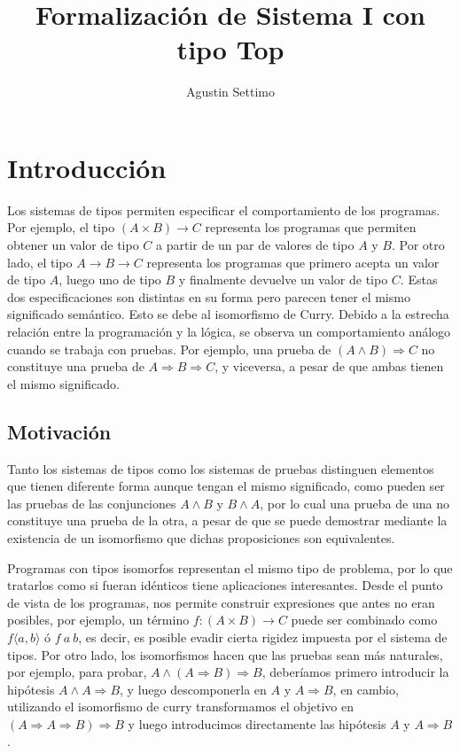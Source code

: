 \documentclass[]{report}
\title{Formalización de Sistema I con tipo Top}
\author{Agustin Settimo}
\begin{document}
	
	\maketitle
	\tableofcontents
	
	\begin{abstract}
		
	\end{abstract}
	
	\chapter{Introducción}
	Los sistemas de tipos permiten especificar el comportamiento de los programas.
	Por ejemplo, el tipo $(A \times B) \rightarrow C$ representa los programas que permiten obtener un valor de tipo $C$ a partir de un par de valores de tipo $A$ y $B$. Por otro lado, el tipo $A \rightarrow B \rightarrow C$ representa los programas que primero acepta un valor de tipo $A$, luego uno de tipo $B$ y finalmente devuelve un valor de tipo $C$.
	Estas dos especificaciones son distintas en su forma pero parecen tener el mismo significado semántico. Esto se debe al isomorfismo de Curry.
	Debido a la estrecha relación entre la programación y la lógica, se observa un comportamiento análogo cuando se trabaja con pruebas.
	Por ejemplo, una prueba de $(A \wedge B) \Rightarrow C$ no constituye una prueba de $A \Rightarrow B \Rightarrow C$, y viceversa, a pesar de que ambas tienen el mismo significado.
	
	\section{Motivación}
	
	Tanto los sistemas de tipos como los sistemas de pruebas distinguen elementos que tienen diferente forma aunque tengan el mismo significado, como pueden ser las pruebas de las conjunciones $A \wedge B$ y $B \wedge A$, por lo cual una prueba de una no constituye una prueba de la otra, a pesar de que se puede demostrar mediante la existencia de un isomorfismo que dichas proposiciones son equivalentes.
	
	Programas con tipos isomorfos representan el mismo tipo de problema, por lo que tratarlos como si fueran idénticos tiene aplicaciones interesantes.
	Desde el punto de vista de los programas, nos permite construir expresiones que antes no eran posibles, por ejemplo, un término $f : (A \times B) \rightarrow C$ puede ser combinado como $f \langle a, b \rangle$ ó $f \: a \: b$, es decir, es posible evadir cierta rigidez impuesta por el sistema de tipos.
	Por otro lado, los isomorfismos hacen que las pruebas sean más naturales, por ejemplo, para probar, $A \wedge (A \Rightarrow  B) \Rightarrow B$, deberíamos primero introducir la hipótesis $A \wedge A \Rightarrow  B$, y luego descomponerla en $A$ y $A \Rightarrow B$, en cambio, utilizando el isomorfismo de curry transformamos el objetivo en $(A \Rightarrow A \Rightarrow  B) \Rightarrow B$ y luego introducimos directamente las hipótesis $A$ y $A \Rightarrow B$.
	
\end{document}
